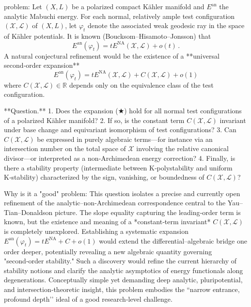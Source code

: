 problem:  
Let \((X,L)\) be a polarized compact Kähler manifold and \(E^{\mathrm{an}}\) the analytic Mabuchi energy.  For each normal, relatively ample test configuration \((\mathcal{X},\mathcal{L})\) of \((X,L)\), let \(\varphi_t\) denote the associated weak geodesic ray in the space of Kähler potentials.  It is known (Boucksom–Hisamoto–Jonsson) that  
\[
E^{\mathrm{an}}(\varphi_t)=tE^{\mathrm{NA}}(\mathcal{X},\mathcal{L})+o(t)\,.
\]
A natural conjectural refinement would be the existence of a **universal second‑order expansion**  
\[
E^{\mathrm{an}}(\varphi_t)=tE^{\mathrm{NA}}(\mathcal{X},\mathcal{L})+C(\mathcal{X},\mathcal{L})+o(1)
\tag{★}
\]
where \(C(\mathcal{X},\mathcal{L})\in\mathbb{R}\) depends only on the equivalence class of the test configuration.  

**Question.**  
1. Does the expansion (★) hold for all normal test configurations of a polarized Kähler manifold?  
2. If so, is the constant term \(C(\mathcal{X},\mathcal{L})\) invariant under base change and equivariant isomorphism of test configurations?  
3. Can \(C(\mathcal{X},\mathcal{L})\) be expressed in purely algebraic terms—for instance via an intersection number on the total space of \(\mathcal{X}\) involving the relative canonical divisor—or interpreted as a non‑Archimedean energy correction?  
4. Finally, is there a stability property (intermediate between K‑polystability and uniform K‑stability) characterized by the sign, vanishing, or boundedness of \(C(\mathcal{X},\mathcal{L})\)?  

Why is it a "good" problem:  
This question isolates a precise and currently open refinement of the analytic–non‑Archimedean correspondence central to the Yau–Tian–Donaldson picture.  The slope equality capturing the leading‑order term is known, but the existence and meaning of a *constant‑term invariant* \(C(\mathcal{X},\mathcal{L})\) is completely unexplored.  Establishing a systematic expansion \(E^{\mathrm{an}}(\varphi_t)=tE^{\mathrm{NA}}+C+o(1)\) would extend the differential–algebraic bridge one order deeper, potentially revealing a new algebraic quantity governing "second‑order stability."  Such a discovery would refine the current hierarchy of stability notions and clarify the analytic asymptotics of energy functionals along degenerations.  Conceptually simple yet demanding deep analytic, pluripotential, and intersection‑theoretic insight, this problem embodies the “narrow entrance, profound depth’’ ideal of a good research‑level challenge.